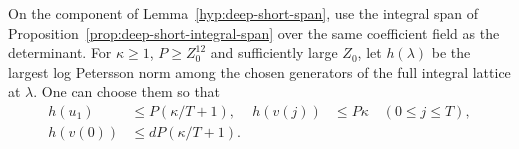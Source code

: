 \begin{lemma}
\label{lem:deep-integral-generators}
On the component of Lemma~\ref{hyp:deep-short-span}, use
the integral span of Proposition~\ref{prop:deep-short-integral-span}
over the same coefficient field as the determinant. For
\(\kappa\ge1\), \(P\ge Z_0^{12}\) and sufficiently large \(Z_0\),
let \(h(\lambda)\) be the largest log Petersson norm among the chosen generators of the full integral lattice at \(\lambda\). One can choose them so that
\[
 \begin{aligned}h(u_1)&\le P(\kappa/T+1),& h(v(j))&\le P\kappa\quad(0\le j\le T),\\h(v(0))&\le dP(\kappa/T+1).\end{aligned}
\]

\end{lemma}

